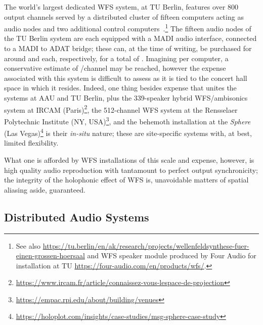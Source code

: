 \documentclass[utf8]{FrontiersinHarvard}
\begin{document}
    The world's largest dedicated WFS system, at TU Berlin, features over 800
    output channels served by a distributed cluster of fifteen computers acting
    as audio nodes and two additional control
    computers~\citep{baalman_renewed_2007}.\footnote{
        See also
        \url{https://tu.berlin/en/ak/research/projects/wellenfeldsynthese-fuer-einen-grossen-hoersaal}
        and WFS speaker module produced by Four Audio for installation at TU
        \url{https://four-audio.com/en/products/wfs/}.
    }
    The fifteen audio nodes of the TU Berlin system are each equipped with a
    MADI audio interface, connected to a MADI to ADAT bridge;
    these can, at the time of writing, be purchased for around
     and  each, respectively, for a
    total of .
    Imagining  per computer, a conservative estimate of
    /channel may be reached, however the expense associated with
    this  system is difficult to assess as it is tied to the concert hall space
    in which it resides.
    Indeed, one thing besides expense that unites the systems at AAU and TU
    Berlin, plus the 339-speaker hybrid WFS/ambisonics system at IRCAM
    (Paris)\footnote{
        \url{https://www.ircam.fr/article/connaissez-vous-lespace-de-projection}
    }, the 512-channel WFS system at the Rensselaer Polytechnic Institute (NY,
    USA)\footnote{
        \url{https://empac.rpi.edu/about/building/venues}
    }, and the behemoth installation at the \textit{Sphere} (Las
    Vegas)\footnote{
        \url{https://holoplot.com/insights/case-studies/msg-sphere-case-study}
    } is their \textit{in-situ} nature;
    these are site-specific systems with, at best, limited flexibility.

    What one is afforded by WFS installations of this scale and expense, however, is
    high quality audio reproduction with tantamount to perfect output synchronicity;
    the integrity of the holophonic effect of WFS is, unavoidable matters of spatial
    aliasing aside, guaranteed.

    \subsection{Distributed Audio Systems}\label{subsec:distributed-audio-systems}
\end{document}
